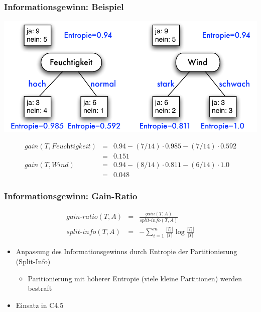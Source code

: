 \begin{frame}
\frametitle{Informationsgewinn: Beispiel}

\begin{center}
\includegraphics[scale=.5]{fig7/gain-beispiel.pdf}
\end{center}

\begin{eqnarray*}
\textit{gain}(T, \textit{Feuchtigkeit}) &=& 0.94 - (7/14) \cdot 0.985 -
(7/14) \cdot 0.592 \\
 &=& 0.151 \\
\textit{gain}(T, \textit{Wind}) &=& 0.94 - (8/14) \cdot 0.811 -
(6/14) \cdot 1.0 \\
&=& 0.048
\end{eqnarray*}
\end{frame}


\begin{frame}
\frametitle{Informationsgewinn: Gain-Ratio}

\begin{eqnarray*}
\textit{gain-ratio}(T,A) &=&
\frac{\textit{gain}(T,A)}{\textit{split-info}(T,A)} \\
\textit{split-info}(T,A)&=&-\sum_{i=1}^m\frac{|T_i|}{|T|} \log \frac{|T_i|}{|T|}
\end{eqnarray*}

\begin{itemize}
\item Anpassung des Informationsgewinns durch Entropie der
  Partitionierung (Split-Info)
\begin{itemize}
\item Paritionierung mit höherer Entropie (viele kleine Partitionen)
  werden bestraft
\end{itemize}
\item Einsatz in C4.5
\end{itemize}

\end{frame}

